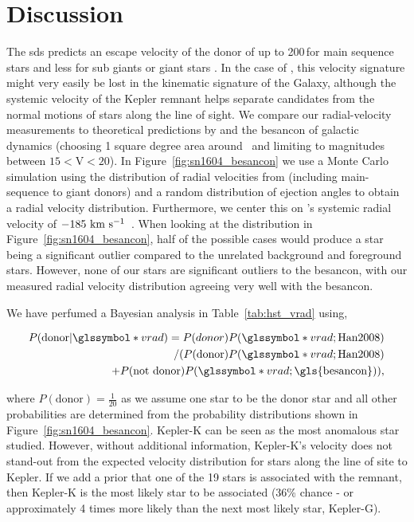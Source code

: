 \documentclass[preprint2]{aastex}
\begin{document}


\section{Discussion}
\label{sec:discussion}

The \gls{sds} predicts an escape velocity of the donor of up to 200\,\kms for main sequence stars and less for sub giants or giant stars \citep[down to roughly 60~\,\kms;][]{2008ApJ...677L.109H}. In the case of , this velocity signature might very easily be lost in the kinematic signature of the Galaxy, although the systemic velocity of the Kepler remnant helps separate candidates from the normal motions of stars along the line of sight. We compare our radial-velocity measurements to theoretical predictions by \citet{2008ApJ...677L.109H} and the \gls{besancon} of galactic dynamics (choosing 1 square degree area around \ and limiting to magnitudes between $15<$V$<20$). In Figure~\ref{fig:sn1604_besancon} we use a Monte Carlo simulation using the distribution of radial velocities from \citet{2008ApJ...677L.109H} (including main-sequence to giant donors) and a random distribution of ejection angles to obtain a radial velocity distribution. Furthermore, we center this on 's systemic radial velocity of $-185~\textrm{km}~\textrm{s}^{-1}$\ \citep{2003A&A...407..249S}. When looking at the \citet{2008ApJ...677L.109H} distribution in Figure~\ref{fig:sn1604_besancon}, half of the possible cases would produce a star being a significant outlier compared to the unrelated background and foreground stars. However, none of our stars are significant outliers to the \gls{besancon}, with our measured radial velocity distribution agreeing very well with the \gls{besancon}. 


We have perfumed a Bayesian analysis in Table~\ref{tab:hst_vrad} using,

\begin{align}
P(\textrm{donor}|\vrad) = P(donor)P(\vrad;\textrm{Han2008})\nonumber\\
 / (P(\textrm{donor})P(\vrad;\textrm{Han2008})\nonumber \\
+ P(\textrm{not donor})P(\vrad;\textrm{\gls{besancon}}))\nonumber,
\end{align}

where $P(\textrm{donor}) = \frac{1}{20}$ as we assume one star to be the donor star and all other probabilities are determined from the probability distributions shown in Figure~\ref{fig:sn1604_besancon}. Kepler-K can be seen as the most anomalous star studied. However, without additional information, Kepler-K's velocity does not stand-out from the expected velocity distribution for stars along the line of site to Kepler. If we add a prior that one of the 19 stars is associated with the remnant, then Kepler-K is the most likely star to be associated (36\% chance - or approximately 4 times more likely than the next most likely star, Kepler-G).
\end{document}
